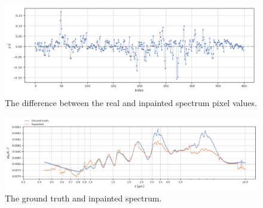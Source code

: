 \begin{figure} [!htb]
    \centering
    \includegraphics[scale=0.4]{figuren/real_inpainted_difference_pixels.png}
    \caption{The difference between the real and inpainted spectrum pixel values. }
    \label{fig:inpainting_pixels_difference}
\end{figure}

\begin{figure} [!htb]
    \centering
    \includegraphics[scale=0.4]{figuren/real_inpainted.png}
    \caption{The ground truth and inpainted spectrum.}
    \label{fig:real_inpainted_spectrum}
\end{figure}

